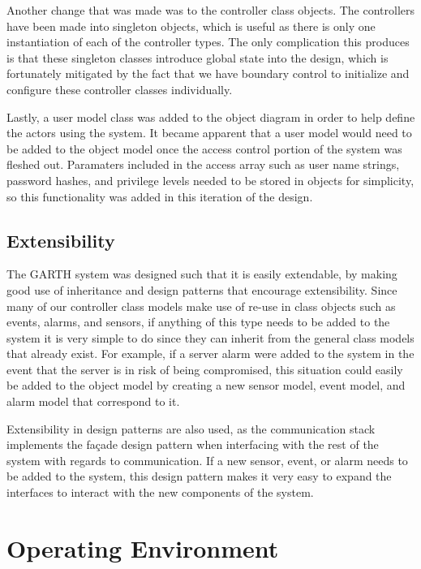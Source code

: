 \documentclass{report}
\begin{document}
Another change that was made was to the controller class objects. The controllers
have been made into singleton objects, which is useful as there is only one
instantiation of each of the controller types. The only complication this produces
is that these singleton classes introduce global state into the design, which
is fortunately mitigated by the fact that we have boundary control to initialize
and configure these controller classes individually. 

Lastly, a user model class was added to the object diagram in order to help
define the actors using the system. It became apparent that a user model would
need to be added to the object model once the access control portion of the 
system was fleshed out. Paramaters included in the access array such as user
name strings, password hashes, and privilege levels needed to be stored in
objects for simplicity, so this functionality was added in this iteration of the
design.

\section{Extensibility}

The GARTH system was designed such that it is easily extendable, by making good
use of inheritance and design patterns that encourage extensibility. Since many
of our controller class models make use of re-use in class objects such as
events, alarms, and sensors, if anything of this type needs to be added to the
system it is very simple to do since they can inherit from the general class
models that already exist. For example, if a server alarm were added to the
system in the event that the server is in risk of being compromised, this
situation could easily be added to the object model by creating a new sensor
model, event model, and alarm model that correspond to it.

Extensibility in design patterns are also used, as the communication stack
implements the fa\c{c}ade design pattern when interfacing with the rest of the
system with regards to communication. If a new sensor, event, or alarm needs to
be added to the system, this design pattern makes it very easy to expand the
interfaces to interact with the new components of the system.

\chapter{Operating Environment} %
\label{ch:operating-environment}
\end{document}
